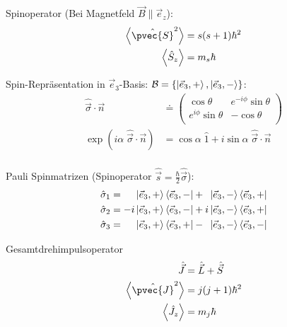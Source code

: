 \documentclass[11pt]{article}
\numberwithin{equation}{section}
\begin{document}
      Spinoperator (Bei Magnetfeld $\vec{B}\parallel\vec{e}_z$):
      \begin{equation}
        \begin{aligned}
          \left<\hat{\pvec{S}}^2\right> &= s(s+1)\hbar^2 \\
          \left<\hat{S}_z\right> &= m_s \hbar \\
        \end{aligned}
      \end{equation}

      Spin-Repräsentation in $\vec{e}_3$-Basis: $\mathcal{B} = \{ \Ket{\vec{e}_3,+}, \Ket{\vec{e}_3,-} \}$:
      \begin{equation}
        \begin{aligned}
          \hat{\vec{\sigma}} \cdot \vec{n} &\doteq
          \left( \begin{matrix}
            \cos\theta & e^{-i\phi}\sin\theta \\
            e^{i\phi}\sin\theta & -\cos\theta \\
          \end{matrix} \right) \\
          \exp\left( i\alpha \; \hat{\vec{\sigma}} \cdot \vec{n} \right) &= \cos\alpha \;\hat{1} + i\sin\alpha \; \hat{\vec{\sigma}} \cdot \vec{n} \\
        \end{aligned}
      \end{equation}

      Pauli Spinmatrizen (Spinoperator $\hat{\vec{s}} = \frac{\hbar}{2} \hat{\vec{\sigma}}$):
      \begin{equation}
        \begin{aligned}
          \hat{\sigma}_1 &= \phantom{-i}\Ket{\vec{e}_3,+} \Bra{\vec{e}_3,-} + \phantom{i}\Ket{\vec{e}_3,-} \Bra{\vec{e}_3,+} \\
          \hat{\sigma}_2 &= -i\Ket{\vec{e}_3,+} \Bra{\vec{e}_3,-} + i\Ket{\vec{e}_3,-} \Bra{\vec{e}_3,+} \\
          \hat{\sigma}_3 &= \phantom{-i}\Ket{\vec{e}_3,+} \Bra{\vec{e}_3,+} - \phantom{i}\Ket{\vec{e}_3,-} \Bra{\vec{e}_3,-} \\
        \end{aligned}
      \end{equation}



      Gesamtdrehimpulsoperator
      \begin{equation}
        \begin{aligned}
          \hat{\vec{J}} &= \hat{\vec{L}} + \hat{\vec{S}} \\
          \left< \hat{\pvec{J}}^2 \right> &= j(j+1)\hbar^2 \\
          \left< \hat{J}_z \right> &= m_j\hbar \\
        \end{aligned}
      \end{equation}
\end{document}
